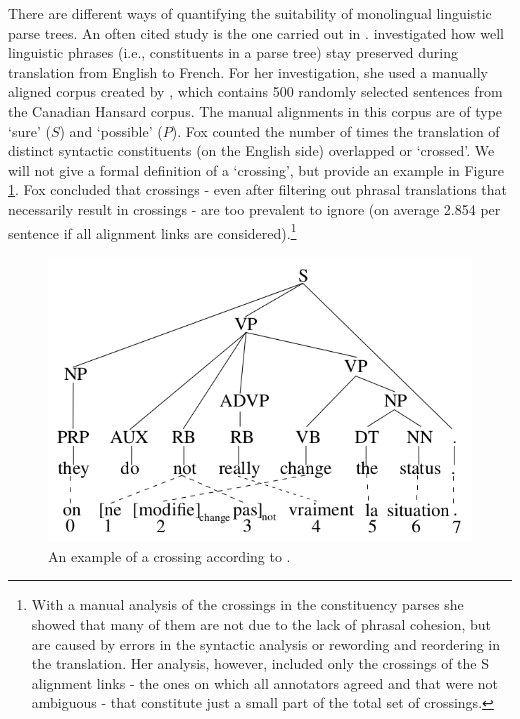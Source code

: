 There are different ways of quantifying the suitability of monolingual linguistic parse trees. An often cited study is the one carried out in \cite{fox2002phrasal}. \citeauthor{fox2002phrasal} investigated how well linguistic phrases (i.e., constituents in a parse tree) stay preserved during translation from English to French. For her investigation, she used a manually aligned corpus created by \cite{och2000improved}, which contains 500 randomly selected sentences from the Canadian Hansard corpus. The manual alignments in this corpus are of type `sure' ($S$) and `possible' ($P$). Fox counted the number of times the translation of distinct syntactic constituents (on the English side) overlapped or `crossed'. We will not give a formal definition of a `crossing', but provide an example in Figure \ref{fig:fox}. Fox concluded that crossings - even after filtering out phrasal translations that necessarily result in crossings - are too prevalent to ignore (on average 2.854 per sentence if all alignment links are considered).\footnote{With a manual analysis of the crossings in the constituency parses she showed that many of them are not due to the lack of phrasal cohesion, but are caused by errors in the syntactic analysis or rewording and reordering in the translation. Her analysis, however, included only the crossings of the S alignment links - the ones on which all annotators agreed and that were not ambiguous - that constitute just a small part of the total set of crossings.}


\begin{figure}[!ht]
\centering
\includegraphics[scale=0.4]{Graphics/crossing.png}
\caption{An example of a crossing according to \cite{fox2002phrasal}.}\label{fig:fox}
\end{figure}

